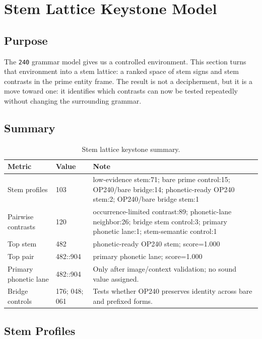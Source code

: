 \section{Stem Lattice Keystone Model}

\subsection{Purpose}

The \texttt{240} grammar model gives us a controlled environment. This section turns that environment into a stem lattice: a ranked space of stem signs and stem contrasts in the prime entity frame. The result is not a decipherment, but it is a move toward one: it identifies which contrasts can now be tested repeatedly without changing the surrounding grammar.

\subsection{Summary}

\begin{table}[htbp]
\centering
\footnotesize
\begin{tabular}{p{}p{}p{}}
\toprule
\textbf{Metric} & \textbf{Value} & \textbf{Note} \\
\midrule
Stem profiles & 103 & low-evidence stem:71; bare prime control:15; OP240/bare bridge:14; phonetic-ready OP240 stem:2; OP240/bare bridge stem:1 \\
Pairwise contrasts & 120 & occurrence-limited contrast:89; phonetic-lane neighbor:26; bridge stem control:3; primary phonetic lane:1; stem-semantic control:1 \\
Top stem & 482 & phonetic-ready OP240 stem; score=1.000 \\
Top pair & 482::904 & primary phonetic lane; score=1.000 \\
Primary phonetic lane & 482::904 & Only after image/context validation; no sound value assigned. \\
Bridge controls & 176; 048; 061 & Tests whether OP240 preserves identity across bare and prefixed forms. \\
\bottomrule
\end{tabular}
\caption{Stem lattice keystone summary.}
\label{tab:stem-lattice-keystone-summary}
\end{table}

\subsection{Stem Profiles}

